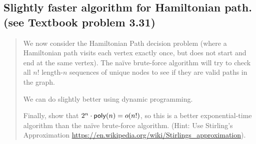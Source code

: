 \subsection*{Slightly faster algorithm for Hamiltonian path. (see Textbook problem 3.31)}
\begin{quote}
    We now consider the Hamiltonian Path decision problem (where a Hamiltonian path visits each vertex exactly once, but does not start and end at the same vertex).
    The na\"{i}ve brute-force algorithm will try to check all $n!$ length-$n$ sequences of unique nodes to see if they are valid paths in the graph.

    We can do slightly better using dynamic programming.

    Finally, show that $2^n \cdot \mathsf{poly}(n)=o(n!)$, so this is a better exponential-time algorithm than the na\"{i}ve brute-force algorithm. (Hint: Use Stirling's Approximation \url{https://en.wikipedia.org/wiki/Stirlings_approximation}).
\end{quote}

